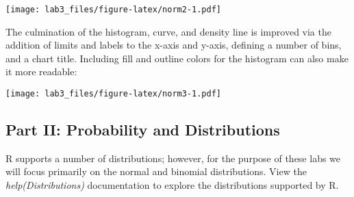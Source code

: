 \documentclass[]{article}
\newenvironment{Shaded}{\begin{snugshade}}{\end{snugshade}}
\newcommand{\KeywordTok}[1]{\textcolor[rgb]{0.13,0.29,0.53}{\textbf{#1}}}
\newcommand{\DataTypeTok}[1]{\textcolor[rgb]{0.13,0.29,0.53}{#1}}
\newcommand{\DecValTok}[1]{\textcolor[rgb]{0.00,0.00,0.81}{#1}}
\newcommand{\FloatTok}[1]{\textcolor[rgb]{0.00,0.00,0.81}{#1}}
\newcommand{\StringTok}[1]{\textcolor[rgb]{0.31,0.60,0.02}{#1}}
\newcommand{\OperatorTok}[1]{\textcolor[rgb]{0.81,0.36,0.00}{\textbf{#1}}}
\newcommand{\NormalTok}[1]{#1}
\begin{document}
\texttt{[image: lab3\_files/figure-latex/norm2-1.pdf]}

The culmination of the histogram, curve, and density line is improved
via the addition of limits and labels to the x-axis and y-axis, defining
a number of bins, and a chart title. Including fill and outline colors
for the histogram can also make it more readable:

\begin{Shaded}
\end{Shaded}

\texttt{[image: lab3\_files/figure-latex/norm3-1.pdf]}

\subsection{Part II: Probability and
Distributions}\label{part-ii-probability-and-distributions}

R supports a number of distributions; however, for the purpose of these
labs we will focus primarily on the normal and binomial distributions.
View the \emph{help(Distributions)} documentation to explore the
distributions supported by R.
\end{document}
